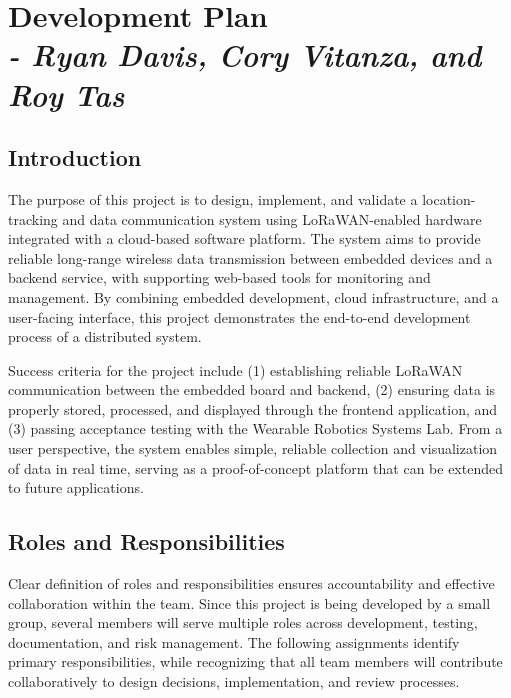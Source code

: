 \chapter{Development Plan \\
\small{\textit{- Ryan Davis, Cory Vitanza, and Roy Tas}}}
\label{Chapter::DevelopmentPlan}

\section{Introduction}

The purpose of this project is to design, implement, and validate a location-tracking and data communication system using LoRaWAN-enabled hardware integrated with a cloud-based software platform. The system aims to provide reliable long-range wireless data transmission between embedded devices and a backend service, with supporting web-based tools for monitoring and management. By combining embedded development, cloud infrastructure, and a user-facing interface, this project demonstrates the end-to-end development process of a distributed system.  

Success criteria for the project include (1) establishing reliable LoRaWAN communication between the embedded board and backend, (2) ensuring data is properly stored, processed, and displayed through the frontend application, and (3) passing acceptance testing with the Wearable Robotics Systems Lab. From a user perspective, the system enables simple, reliable collection and visualization of data in real time, serving as a proof-of-concept platform that can be extended to future applications.


\section{Roles and Responsibilities}

Clear definition of roles and responsibilities ensures accountability and effective collaboration within the team.  
Since this project is being developed by a small group, several members will serve multiple roles across development, testing, documentation, and risk management.  
The following assignments identify primary responsibilities, while recognizing that all team members will contribute collaboratively to design decisions, implementation, and review processes.


